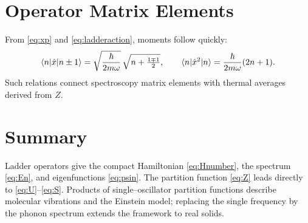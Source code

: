 \documentclass[12pt]{article}
\numberwithin{equation}{section}
\newcommand{\h}{\hbar}
\newcommand{\w}{\omega}
\begin{document}
\section{Operator Matrix Elements}
From \eqref{eq:xp} and \eqref{eq:ladderaction}, moments follow quickly:
\begin{equation}
\braket{n|\hat x|n\pm1}=\sqrt{\frac{\h}{2m\w}}\,\sqrt{n+\tfrac{1\mp1}{2}}, \qquad \braket{n|\hat x^2|n}=\frac{\h}{2m\w}(2n+1).
\label{eq:xmoments}
\end{equation}
Such relations connect spectroscopy matrix elements with thermal averages derived from $Z$.

\section{Summary}
Ladder operators give the compact Hamiltonian \eqref{eq:Hnumber}, the spectrum \eqref{eq:En}, and eigenfunctions \eqref{eq:psin}. The partition function \eqref{eq:Z} leads directly to \eqref{eq:U}--\eqref{eq:S}. Products of single--oscillator partition functions describe molecular vibrations and the Einstein model; replacing the single frequency by the phonon spectrum extends the framework to real solids.
\end{document}
